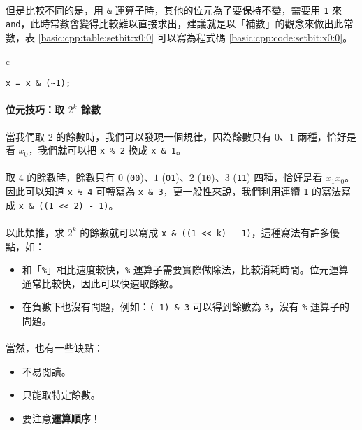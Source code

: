 \documentclass[12pt,a4paper,oneside]{report}
\begin{document}
\begin{CJK}{UTF8}{bkai}
\paragraph{}但是比較不同的是，用 \lstinline!&! 運算子時，其他的位元為了要保持不變，需要用 \lstinline!1! 來 \texttt{and}，此時常數會變得比較難以直接求出，建議就是以「補數」的觀念來做出此常數，表 \ref{basic:cpp:table:setbit:x0:0} 可以寫為程式碼 \ref{basic:cpp:code:setbit:x0:0}。

\begin{code}[h!]
\centering
\begin{tabular}{c}
\begin{lstlisting}
x = x & (~1);
\end{lstlisting}
\end{tabular}
\caption{將 $x_0$ 設為 \lstinline!0!}
\label{basic:cpp:code:setbit:x0:0}
\end{code}

\paragraph{位元技巧：取 $2^k$ 餘數}當我們取 
2 的餘數時，我們可以發現一個規律，因為餘數只有 0、1 兩種，恰好是看 $x_0$，我們就可以把 \lstinline!x % 2! 換成 \lstinline!x & 1!。

\paragraph{}取 4 的餘數時，餘數只有 $0$ (\lstinline!00!)、$1$ (\lstinline!01!)、$2$ (\lstinline!10!)、$3$ (\lstinline!11!) 四種，恰好是看 $x_1x_0$。因此可以知道 \lstinline!x % 4! 可轉寫為 \lstinline!x & 3!，更一般性來說，我們利用連續 \lstinline!1! 的寫法寫成 \lstinline!x & ((1 << 2) - 1)!。
\paragraph{}以此類推，求 $2^k$ 的餘數就可以寫成 \lstinline!x & ((1 << k) - 1)!，這種寫法有許多優點，如：
\begin{itemize}
\item 和「\lstinline!%!」相比速度較快，\lstinline!%! 運算子需要實際做除法，比較消耗時間。位元運算通常比較快，因此可以快速取餘數。
\item 在負數下也沒有問題，例如：\lstinline!(-1) & 3! 可以得到餘數為 \lstinline!3!，沒有 \lstinline!%! 運算子的問題。
\end{itemize}

\paragraph{}當然，也有一些缺點：
\begin{itemize}
\item 不易閱讀。
\item 只能取特定餘數。
\item 要注意\textbf{運算順序}！
\end{itemize}


\end{CJK}
\end{document}
